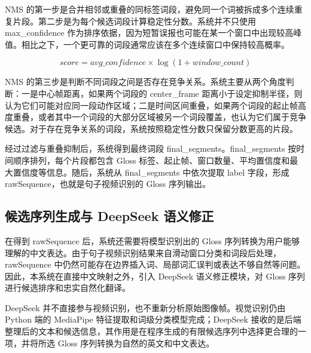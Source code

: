 NMS 的第一步是合并相邻或重叠的同标签词段，避免同一个词被拆成多个连续重复片段。第二步是为每个候选词段计算稳定性分数。系统并不只使用 max\_confidence 作为排序依据，因为短暂误报也可能在某一个窗口中出现较高峰值。相比之下，一个更可靠的词段通常应该在多个连续窗口中保持较高概率。

\begin{equation}
score = avg\_confidence \times \log(1 + window\_count)
\label{eq:chapter06-segment-score}
\end{equation}

NMS 的第三步是判断不同词段之间是否存在竞争关系。系统主要从两个角度判断：一是中心帧距离，如果两个词段的 center\_frame 距离小于设定抑制半径，则认为它们可能对应同一段动作区域；二是时间区间重叠，如果两个词段的起止帧高度重叠，或者其中一个词段的大部分区域被另一个词段覆盖，也认为它们属于竞争候选。对于存在竞争关系的词段，系统按照稳定性分数只保留分数更高的片段。

经过过滤与重叠抑制后，系统得到最终词段 final\_segments。final\_segments 按时间顺序排列，每个片段都包含 Gloss 标签、起止帧、窗口数量、平均置信度和最大置信度等信息。随后，系统从 final\_segments 中依次提取 label 字段，形成 rawSequence，也就是句子视频识别的 Gloss 序列输出。

\subsection{候选序列生成与 DeepSeek 语义修正}

在得到 rawSequence 后，系统还需要将模型识别出的 Gloss 序列转换为用户能够理解的中文表达。由于句子视频识别结果来自滑动窗口分类和词段后处理，rawSequence 中仍然可能存在边界插入词、局部词汇误判或表达不够自然等问题。因此，本系统在直接中文映射之外，引入 DeepSeek 语义修正模块，对 Gloss 序列进行候选排序和忠实自然化翻译。

DeepSeek 并不直接参与视频识别，也不重新分析原始图像帧。视觉识别仍由 Python 端的 MediaPipe 特征提取和词级分类模型完成；DeepSeek 接收的是后端整理后的文本和候选信息，其作用是在程序生成的有限候选序列中选择更合理的一项，并将所选 Gloss 序列转换为自然的英文和中文表达。




